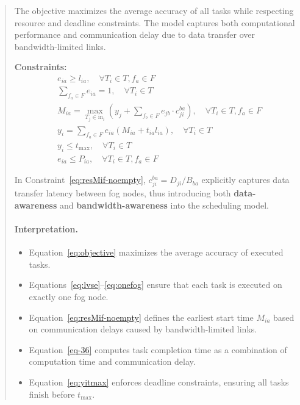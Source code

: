 \documentclass[conference]{IEEEtran}
\begin{document}
\begin{abstract}
The objective maximizes the average accuracy of all tasks while respecting resource and deadline constraints. The model captures both computational performance and communication delay due to data transfer over bandwidth-limited links.

\noindent
\textbf{Constraints:}
\begin{align}
    &e_{ia} \geq l_{ia}, \quad \forall T_i \in T, f_a \in F \label{eq:lvse} \\ 
    &\sum_{f_a \in F} e_{ia} = 1, \quad \forall T_i \in T \label{eq:onefog} \\
    &M_{ia} = \max_{T_j \in \text{in}_i} \left( y_j + \sum_{f_b \in F} e_{jb} \cdot c_{ji}^{ba} \right), \quad \forall T_i \in T, f_a \in F
    \label{eq:resMif-noempty} \\
    &y_i = \sum_{f_a \in F} e_{ia} \left( M_{ia} + t_{ia} l_{ia} \right), \quad \forall T_i \in T \label{eq-36}\\
    &y_i \leq t_{\max}, \quad \forall T_i \in T \label{eq:yitmax} \\
    &e_{ia} \leq P_{ia}, \quad \forall T_i \in T, f_a \in F \label{eq:permitted}
\end{align}

\noindent
In Constraint~\ref{eq:resMif-noempty}, \( c_{ji}^{ba} = D_{ji} / B_{ba} \) explicitly captures data transfer latency between fog nodes, thus introducing both \textbf{data-awareness} and \textbf{bandwidth-awareness} into the scheduling model.

\paragraph*{Interpretation.}
\begin{itemize}
    \item Equation~\ref{eq:objective} maximizes the average accuracy of executed tasks.
    \item Equations~\ref{eq:lvse}–\ref{eq:onefog} ensure that each task is executed on exactly one fog node.
    \item Equation~\ref{eq:resMif-noempty} defines the earliest start time \(M_{ia}\) based on communication delays caused by bandwidth-limited links.
    \item Equation~\ref{eq-36} computes task completion time as a combination of computation time and communication delay.
    \item Equation~\ref{eq:yitmax} enforces deadline constraints, ensuring all tasks finish before \(t_{\max}\).
\end{itemize}


\end{abstract}
\end{document}
